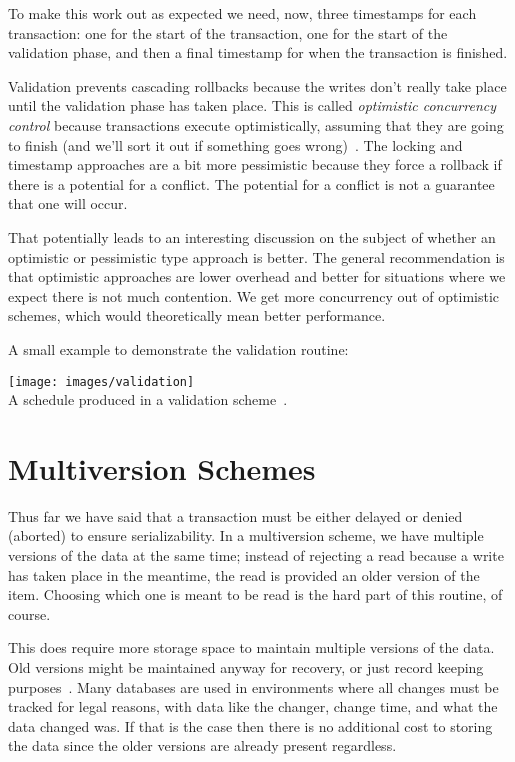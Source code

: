 \documentclass[a4paper]{report}
\begin{document}
To make this work out as expected we need, now, three timestamps for each transaction: one for the start of the transaction, one for the start of the validation phase, and then a final timestamp for when the transaction is finished.

Validation prevents cascading rollbacks because the writes don't really take place until the validation phase has taken place. This is called \textit{optimistic concurrency control} because transactions execute optimistically, assuming that they are going to finish (and we'll sort it out if something goes wrong)~\cite{dsc}. The locking and timestamp approaches are a bit more pessimistic because they force a rollback if there is a potential for a conflict. The potential for a conflict is not a guarantee that one will occur.

That potentially leads to an interesting discussion on the subject of whether an optimistic or pessimistic type approach is better. The general recommendation is that optimistic approaches are lower overhead and better for situations where we expect there is not much contention. We get more concurrency out of optimistic schemes, which would theoretically mean better performance.

A small example to demonstrate the validation routine:

\begin{center}
	\texttt{[image: images/validation]}\\
	A schedule produced in a validation scheme~\cite{dsc}.
\end{center}

\section*{Multiversion Schemes}

Thus far we have said that a transaction must be either delayed or denied (aborted) to ensure serializability. In a multiversion scheme, we have multiple versions of the data at the same time; instead of rejecting a read because a write has taken place in the meantime, the read is provided an older version of the item. Choosing which one is meant to be read is the hard part of this routine, of course.

This does require more storage space to maintain multiple versions of the data. Old versions might be maintained anyway for recovery, or just record keeping purposes~\cite{fds}. Many databases are used in environments where all changes must be tracked for legal reasons, with data like the changer, change time, and what the data changed was. If that is the case then there is no additional cost to storing the data since the older versions are already present regardless. 
\end{document}
